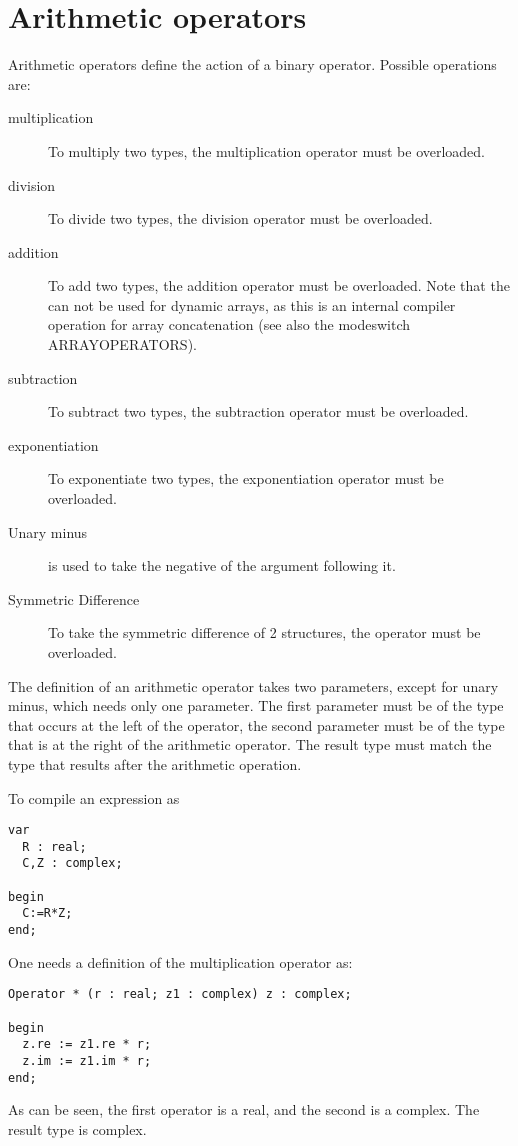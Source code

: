 \section{Arithmetic operators}
Arithmetic operators define the action of a binary operator. Possible
operations are:
\begin{description}
\item[multiplication] To multiply two types, the \var{*} multiplication
operator must be overloaded.
\item[division] To divide two types, the \var{/} division
operator must be overloaded.
\item[addition] To add two types, the \var{+} addition
operator must be overloaded. Note that the \var{+} can not be used for
dynamic arrays, as this is an internal compiler operation for array
concatenation (see also the modeswitch ARRAYOPERATORS).
\item[subtraction] To subtract two types, the \var{-} subtraction
operator must be overloaded.
\item[exponentiation] To exponentiate two types, the \var{**} exponentiation
operator must be overloaded.
\item[Unary minus] is used to take the negative of the argument following
it.
\item[Symmetric Difference] To take the symmetric difference of 2
structures, the \var{><} operator must be overloaded.
\end{description}

The definition of an arithmetic operator takes two parameters, except for
unary minus, which needs only one parameter. The first parameter must be of
the type that occurs at the left of the operator, the second parameter must
be of the type that is at the right of the arithmetic operator. The result
type must match the type that results after the arithmetic operation.

To compile an expression as
\begin{verbatim}
var
  R : real;
  C,Z : complex;

begin
  C:=R*Z;
end;
\end{verbatim}
One needs a definition of the multiplication operator as:
\begin{verbatim}
Operator * (r : real; z1 : complex) z : complex;

begin
  z.re := z1.re * r;
  z.im := z1.im * r;
end;
\end{verbatim}
As can be seen, the first operator is a real, and the second is
a complex. The result type is complex.

